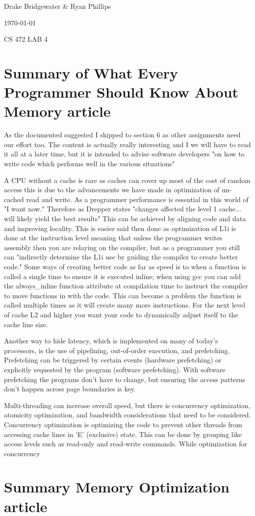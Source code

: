 \documentclass[letterpaper,12pt,titlepage]{article}
\def\name{Drake Bridgewater \& Ryan Phillips}
\begin{document}
\hfill \name

\hfill \today

\hfill CS 472 LAB 4

\section*{Summary of What Every Programmer Should Know About Memory article}
As the documented suggested I skipped to section 6 as other assignments need our effort too. The content is actually really interesting and I we will have to read it all at a later time, but it is intended to advise software developers "on how to write code which performs well in the various situations" \cite[p.~2]{Drepper} 

A CPU without a cache is rare as caches can cover up most of the cost of random access this is due to the advancements we have made in optimization of un-cached read and write. As a programmer performance is essential in this world of "I want now." Therefore as Drepper states "changes affected the level 1 cache... will likely yield the best results" \cite[p.~49]{Drepper} This can be achieved by aligning code and data and improving locality. This is easier said then done as optimization of L1i is done at the instruction level meaning that unless the programmer writes assembly then you are relaying on the compiler, but as a programmer you still can "indirectly determine the L1i use by guiding the compiler to create better code." \cite[p.~55]{Drepper} Some ways of creating better code as far as speed is to when a function is called a single time to ensure it is executed inline; when using gcc you can add the always\_inline function attribute at compilation time to instruct the compiler to move functions in with the code. This can become a problem the function is called multiple times as it will create many more instructions. For the next level of cache L2 and higher you want your code to dynamically adjust itself to the cache line size. 

Another way to hide latency, which is implemented on many of today's processors, is the use of pipelining, out-of-order execution, and prefetching. Prefetching can be triggered by certain
events (hardware prefetching) or explicitly requested by the program (software prefetching). \cite[p.~61]{Drepper} With software prefetching the programs don't have to change, but ensuring the access patterns don't happen across page boundaries is key. 

Multi-threading can increase overall speed, but there is concurrency optimization, atomicity optimization, and bandwidth considerations that need to be considered. Concurrency optimization is optimizing the code to prevent other threads from accessing  cache lines in 'E' (exclusive) state. This can be done by grouping like access levels such as read-only and read-write commands. While optimization for concurrency 

\section*{Summary Memory Optimization article}



\end{document}
